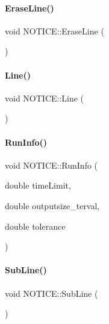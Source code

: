 \paragraph{\texorpdfstring{Erase\+Line()}{EraseLine()}}
{\footnotesize\ttfamily void N\+O\+T\+I\+C\+E\+::\+Erase\+Line (\begin{DoxyParamCaption}{ }\end{DoxyParamCaption})\hspace{0.3cm}{\ttfamily [inline]}}

\mbox{\label{namespace_n_o_t_i_c_e_a9536e3b7bb1f9b6af83b1a5cdf3a56d3}} 
\paragraph{\texorpdfstring{Line()}{Line()}}
{\footnotesize\ttfamily void N\+O\+T\+I\+C\+E\+::\+Line (\begin{DoxyParamCaption}{ }\end{DoxyParamCaption})\hspace{0.3cm}{\ttfamily [inline]}}

\mbox{\label{namespace_n_o_t_i_c_e_ab85b7138c5f1deaeeedad94b7bad2477}} 
\paragraph{\texorpdfstring{Run\+Info()}{RunInfo()}}
{\footnotesize\ttfamily void N\+O\+T\+I\+C\+E\+::\+Run\+Info (\begin{DoxyParamCaption}\item[{double}]{time\+Limit,  }\item[{double}]{outputsize\+\_\+terval,  }\item[{double}]{tolerance }\end{DoxyParamCaption})\hspace{0.3cm}{\ttfamily [inline]}}

\mbox{\label{namespace_n_o_t_i_c_e_a782778073f9df89a3d20a7faa16494aa}} 
\paragraph{\texorpdfstring{Sub\+Line()}{SubLine()}}
{\footnotesize\ttfamily void N\+O\+T\+I\+C\+E\+::\+Sub\+Line (\begin{DoxyParamCaption}{ }\end{DoxyParamCaption})\hspace{0.3cm}{\ttfamily [inline]}}

